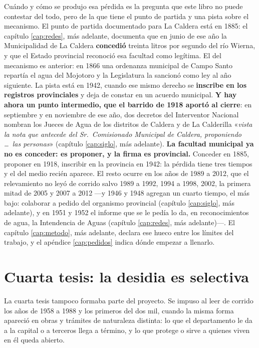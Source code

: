 Cuándo y cómo se produjo esa pérdida es la pregunta que este libro no puede contestar del
todo, pero de la que tiene el punto de partida y una pista sobre el mecanismo. El punto de
partida documentado para La Caldera está en 1885: el capítulo \ref{cap:redes}, más adelante, documenta que en junio de ese año la Municipalidad de
La Caldera \textbf{concedió} treinta litros por segundo del río Wierna, y que el Estado
provincial reconoció esa facultad como legítima. El del mecanismo es anterior: en 1866 una ordenanza municipal de Campo Santo repartía el agua del Mojotoro y la Legislatura la sancionó como ley al año siguiente. La pista está en 1942, cuando ese mismo
derecho se \textbf{inscribe en los registros provinciales} y deja de constar en un acuerdo
municipal. \textbf{Y hay ahora un punto intermedio, que el barrido de 1918 aportó al cierre}: en
septiembre y en noviembre de ese año, dos decretos del Interventor Nacional nombran los Jueces de
Agua de los distritos de Caldera y de La Calderilla «\textit{vista la nota que antecede del Sr.\
Comisionado Municipal de Caldera, proponiendo \ldots\ las personas}» (capítulo
\ref{cap:siglo}, más adelante). \textbf{La facultad municipal ya no es conceder: es proponer, y la firma es
provincial.} Conceder en 1885, proponer en 1918, inscribir en la provincia en 1942: la pérdida
tiene tres tiempos y el del medio recién aparece. El resto ocurre en los años de 1989 a 2012, que el relevamiento no leyó de corrido salvo 1989 a 1992, 1994 a 1998, 2002, la primera mitad de 2005 y 2007 a 2012 ---y 1946 y 1948 agregan un cuarto tiempo, el más bajo: colaborar a pedido del organismo provincial (capítulo \ref{cap:siglo}, más adelante), y en 1951 y 1952 el informe que se le pedía lo da, en reconocimientos de agua, la Intendencia de Aguas (capítulo \ref{cap:redes}, más adelante)---. El
capítulo \ref{cap:metodo}, más adelante, declara ese hueco entre los límites del trabajo, y el apéndice \ref{cap:pedidos} indica dónde
empezar a llenarlo.

\section{Cuarta tesis: la desidia es selectiva}

La cuarta tesis tampoco formaba parte del proyecto. Se impuso al leer de corrido los años de 1958 a 1988 y los primeros del dos mil, cuando la misma forma apareció en obras y trámites de naturaleza distinta: lo que el departamento le da a la capital o a terceros llega a término, y lo que protege o sirve a quienes viven en él queda abierto.

